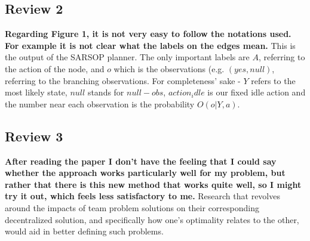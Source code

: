 \documentclass[a4paper]{article}
\begin{document}
\subsection{Review 2}
\textbf{Regarding Figure 1, it is not very easy to follow the notations used. For example
it is not clear what the labels on the edges mean.}
This is the output of the SARSOP planner. The only important labels are $A$, referring to the action of the node, and $o$ which is the observations (e.g. $\left(yes,null\right)$, referring to the branching observations.
For completeness' sake -
$Y$ refers to the most likely state, $null$ stands for $null-obs$, $action_idle$ is our fixed idle action and the number near each observation is the probability $O(o|Y,a)$.

\subsection{Review 3}
\textbf{After reading the paper I don't have the feeling
that I could say whether the approach works particularly well for my problem,
but rather that there is this new method that works quite well, so I might try
it out, which feels less satisfactory to me.}
Research that revolves around the impacts of team problem solutions on their corresponding decentralized solution, and specifically how one's optimality relates to the other, would aid in better defining such problems.
\end{document}
